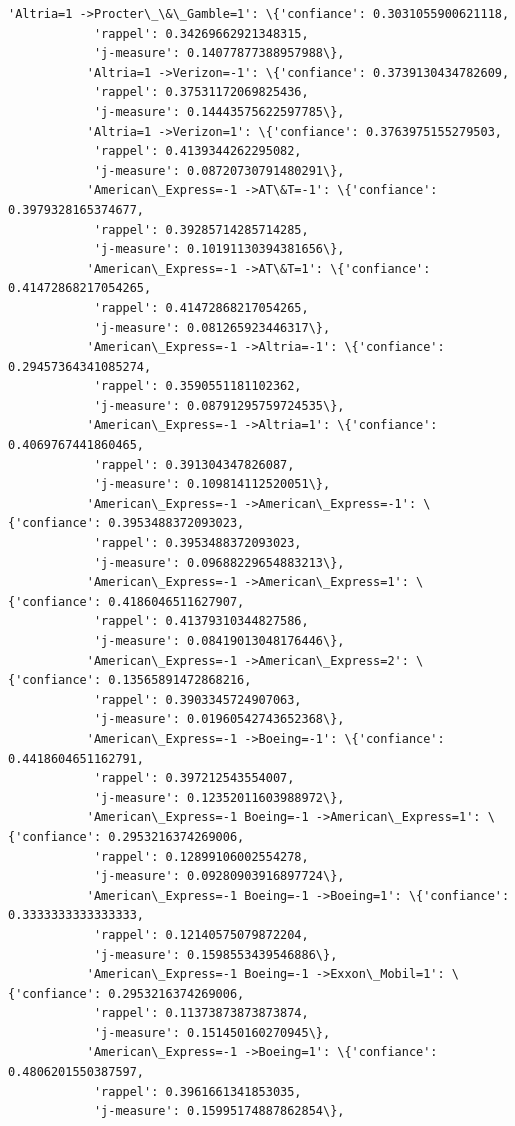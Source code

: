 \documentclass[11pt]{article}
\begin{document}
\begin{Verbatim}[commandchars=\\\{\}]
           'Altria=1 ->Procter\_\&\_Gamble=1': \{'confiance': 0.3031055900621118,
            'rappel': 0.34269662921348315,
            'j-measure': 0.14077877388957988\},
           'Altria=1 ->Verizon=-1': \{'confiance': 0.3739130434782609,
            'rappel': 0.37531172069825436,
            'j-measure': 0.14443575622597785\},
           'Altria=1 ->Verizon=1': \{'confiance': 0.3763975155279503,
            'rappel': 0.4139344262295082,
            'j-measure': 0.08720730791480291\},
           'American\_Express=-1 ->AT\&T=-1': \{'confiance': 0.3979328165374677,
            'rappel': 0.39285714285714285,
            'j-measure': 0.10191130394381656\},
           'American\_Express=-1 ->AT\&T=1': \{'confiance': 0.41472868217054265,
            'rappel': 0.41472868217054265,
            'j-measure': 0.081265923446317\},
           'American\_Express=-1 ->Altria=-1': \{'confiance': 0.29457364341085274,
            'rappel': 0.3590551181102362,
            'j-measure': 0.08791295759724535\},
           'American\_Express=-1 ->Altria=1': \{'confiance': 0.4069767441860465,
            'rappel': 0.391304347826087,
            'j-measure': 0.109814112520051\},
           'American\_Express=-1 ->American\_Express=-1': \{'confiance': 0.3953488372093023,
            'rappel': 0.3953488372093023,
            'j-measure': 0.09688229654883213\},
           'American\_Express=-1 ->American\_Express=1': \{'confiance': 0.4186046511627907,
            'rappel': 0.41379310344827586,
            'j-measure': 0.08419013048176446\},
           'American\_Express=-1 ->American\_Express=2': \{'confiance': 0.13565891472868216,
            'rappel': 0.3903345724907063,
            'j-measure': 0.01960542743652368\},
           'American\_Express=-1 ->Boeing=-1': \{'confiance': 0.4418604651162791,
            'rappel': 0.397212543554007,
            'j-measure': 0.12352011603988972\},
           'American\_Express=-1 Boeing=-1 ->American\_Express=1': \{'confiance': 0.2953216374269006,
            'rappel': 0.12899106002554278,
            'j-measure': 0.09280903916897724\},
           'American\_Express=-1 Boeing=-1 ->Boeing=1': \{'confiance': 0.3333333333333333,
            'rappel': 0.12140575079872204,
            'j-measure': 0.1598553439546886\},
           'American\_Express=-1 Boeing=-1 ->Exxon\_Mobil=1': \{'confiance': 0.2953216374269006,
            'rappel': 0.11373873873873874,
            'j-measure': 0.151450160270945\},
           'American\_Express=-1 ->Boeing=1': \{'confiance': 0.4806201550387597,
            'rappel': 0.3961661341853035,
            'j-measure': 0.15995174887862854\},

\end{Verbatim}
\end{document}
